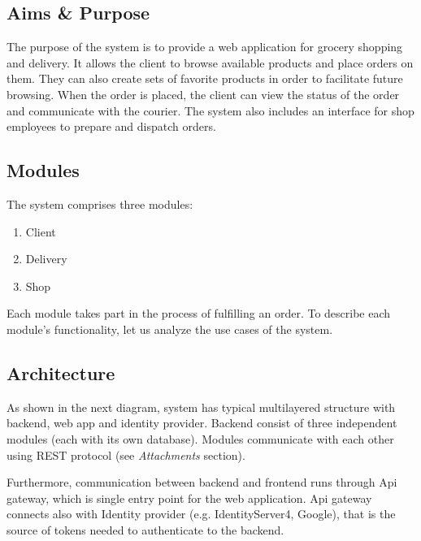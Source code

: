 \documentclass[../main.tex]{subfiles}
\begin{document}
\subsection{Aims \& Purpose}
The purpose of the system is to provide a web application for grocery shopping and delivery. It allows the client to browse available products and place orders on them. They can also create sets of favorite products in order to facilitate future browsing. When the order is placed, the client can view the status of the order and communicate with the courier. The system also includes an interface for shop employees to prepare and dispatch orders.

\subsection{Modules}
The system comprises three modules:
\begin{enumerate}
    \item Client %
    \item Delivery %
    \item Shop %
\end{enumerate}

Each module takes part in the process of fulfilling an order. To describe each module's functionality, let us analyze the use cases of the system.

\subsection{Architecture}



As shown in the next diagram, system has typical multilayered structure with backend, web app and identity provider. Backend consist of three independent modules (each with its own database). Modules communicate with each other using REST protocol (see \textit{Attachments} section).

Furthermore, communication between backend and frontend runs through Api gateway, which is single entry point for the web application. Api gateway connects also with Identity provider (e.g. IdentityServer4, Google), that is the source of tokens needed to authenticate to the backend.
\end{document}
